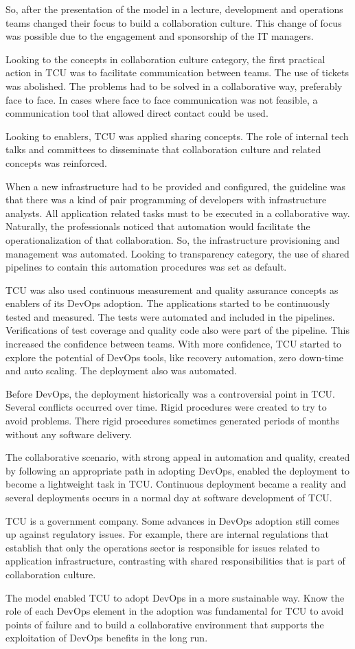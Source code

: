 So, after the presentation of the model in a lecture, development and
operations teams changed their focus to build a collaboration culture. This
change of focus was possible due to the engagement and sponsorship of the IT
managers.

Looking to the concepts in collaboration culture category, the first practical
action in TCU was to facilitate communication between teams. The use of tickets
was abolished. The problems had to be solved in a collaborative way, preferably
face to face. In cases where face to face communication was not feasible, a
communication tool that allowed direct contact could be used.

Looking to enablers, TCU was applied sharing concepts. The role of internal
tech talks and committees to disseminate that collaboration culture and related
concepts was reinforced.

When a new infrastructure had to be provided and configured, the guideline was
that there was a kind of pair programming of developers with infrastructure
analysts. All application related tasks must to be executed in a collaborative
way. Naturally, the professionals noticed that automation would facilitate the
operationalization of that collaboration. So, the infrastructure provisioning
and management was automated. Looking to transparency category, the use of
shared pipelines to contain this automation procedures was set as default.

TCU was also used continuous measurement and quality assurance concepts as
enablers of its DevOps adoption. The applications started to be continuously
tested and measured. The tests were automated and included in the pipelines.
Verifications of test coverage and quality code also were part of the pipeline.
This increased the confidence between teams. With more confidence, TCU started
to explore the potential of DevOps tools, like recovery automation, zero
down-time and auto scaling. The deployment also was automated.

Before DevOps, the deployment historically was a controversial point in TCU.
Several conflicts occurred over time. Rigid procedures were created to try to
avoid problems. There rigid procedures sometimes generated periods of months
without any software delivery.

The collaborative scenario, with strong appeal in automation and quality, created by following an appropriate path in adopting DevOps, enabled the deployment to become a lightweight task in TCU. Continuous deployment became a reality and several deployments occurs in a normal day at software development of TCU.

TCU is a government company. Some advances in DevOps adoption still comes up
against regulatory issues. For example, there are internal regulations that
establish that only the operations sector is responsible for issues related to
application infrastructure, contrasting with shared responsibilities that is
part of collaboration culture.

The model enabled TCU to adopt DevOps in a more sustainable way. Know the role
of each DevOps element in the adoption was fundamental for TCU to avoid points
of failure and to build a collaborative environment that supports the
exploitation of DevOps benefits in the long run.

